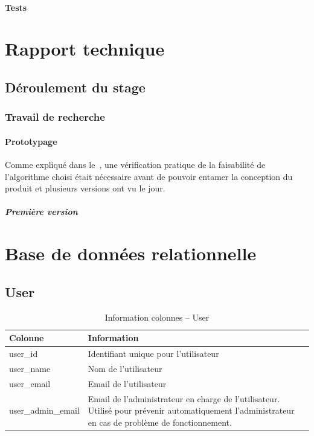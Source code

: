 \documentclass[a4paper,10pt, twoside]{report}
\begin{document}
\begin{spacing}{1.2}
\subsubsection{Tests}


\chapter{Rapport technique}
\thispagestyle{fancy}
\label{rapportTechnique}
\section{D\'eroulement du stage}
\subsection{Travail de recherche}
\subsubsection{Prototypage}
Comme expliqu\'e dans le~, une v\'erification pratique
de la faisabilit\'e de l'algorithme choisi \'etait n\'ecessaire avant de
pouvoir entamer la conception du produit et plusieurs versions ont vu le jour.

\paragraph{Premi\`ere version}



\newpage
\listoffigures
\listoftables



\appendix
\makeatletter
\def\@seccntformat#1{Annexe~\csname the#1\endcsname:\quad}
\makeatother
\chapter{Base de donn\'ees relationnelle}
\label{annBDR}
\thispagestyle{fancy}
\section{User}
\begin{table}[h!]
  \centering
  \def\arraystretch{1.5}
  \setlength{\fboxsep}{13pt} %
  \setlength{\fboxrule}{0pt} %
  \begin{tabular}{lm{6cm}m{6cm}}
   \rowcolor{arkred} 
    \arrayrulecolor{gray73}\hline
    \color{white} \textbf{Colonne} & \color{white} \textbf{Information}\\
    \hline
    user\_id & Identifiant unique pour l'utilisateur\\
    \hline
    user\_name & Nom de l'utilisateur\\
    \hline
    user\_email & Email de l'utilisateur\\
    \hline
    user\_admin\_email & Email de l'administrateur en charge de l'utilisateur.
    Utilis\'e pour pr\'evenir automatiquement l'administrateur en cas de
    probl\`eme de fonctionnement.
  \end{tabular}
  \caption{\label{tabDBRUser} Information colonnes -- User}
\end{table}


\end{spacing}
\end{document}
